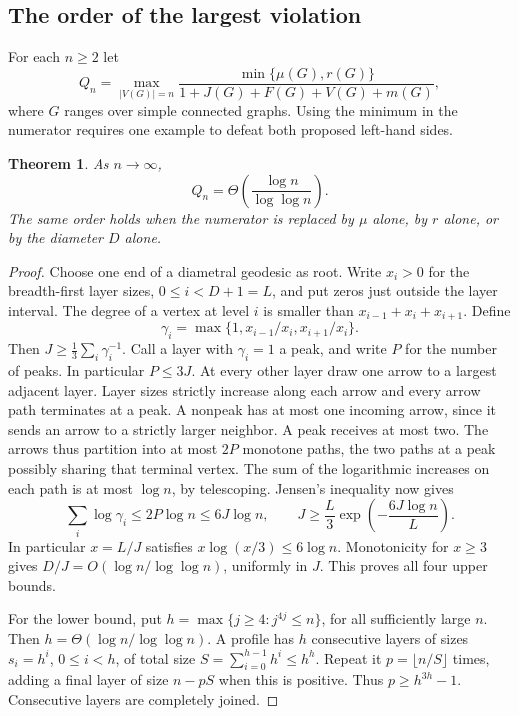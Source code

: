 \documentclass[11pt,a4paper]{article}
\newtheorem{theorem}{Theorem}[section]
\theoremstyle{remark}\newtheorem*{remark}{Remark}
\begin{document}
\subsection{The order of the largest violation}
For each $n\ge2$ let
\[
 Q_n=\max_{|V(G)|=n}\frac{\min\{\mu(G),r(G)\}}
             {1+J(G)+F(G)+V(G)+m(G)},
\]
where $G$ ranges over simple connected graphs. Using the minimum in the
numerator requires one example to defeat both proposed left-hand sides.

\begin{theorem}\label{thm:syn-chain-rate}
As $n\longrightarrow\infty$,
\[
 Q_n=\Theta\!\left(\frac{\log n}{\log\log n}\right).
\]
The same order holds when the numerator is replaced by $\mu$ alone, by
$r$ alone, or by the diameter $D$ alone.
\end{theorem}
\begin{proof}
Choose one end of a diametral geodesic as root. Write $x_i>0$ for the
breadth-first layer sizes, $0\le i<D+1=L$, and put zeros just outside
the layer interval. The degree of a vertex at level $i$ is smaller than
$x_{i-1}+x_i+x_{i+1}$. Define
\[
 \gamma_i=\max\{1,x_{i-1}/x_i,x_{i+1}/x_i\}.
\]
Then $J\ge\frac13\sum_i\gamma_i^{-1}$. Call a layer with
$\gamma_i=1$ a peak, and write $P$ for the number of peaks. In
particular $P\le3J$. At every other layer draw one arrow to a largest
adjacent layer. Layer sizes strictly increase along each arrow and every
arrow path terminates at a peak. A nonpeak has at most one incoming
arrow, since it sends an arrow to a strictly larger neighbor. A peak
receives at most two. The arrows thus partition into at most $2P$
monotone paths, the two paths at a peak possibly sharing that terminal
vertex. The sum of the logarithmic increases on each path is at most
$\log n$, by telescoping. Jensen's inequality now gives
\[
 \sum_i\log\gamma_i\le2P\log n\le6J\log n,
 \qquad J\ge\frac L3\exp\!\left(-\frac{6J\log n}{L}\right).
\]
In particular $x=L/J$ satisfies $x\log(x/3)\le6\log n$. Monotonicity for
$x\ge3$ gives $D/J=O(\log n/\log\log n)$, uniformly in $J$. This proves
all four upper bounds.

For the lower bound, put $h=\max\{j\ge4:j^{4j}\le n\}$, for all
sufficiently large $n$. Then $h=\Theta(\log n/\log\log n)$. A profile
has $h$ consecutive layers of sizes $s_i=h^i$, $0\le i<h$, of total
size $S=\sum_{i=0}^{h-1}h^i\le h^h$. Repeat it $p=\lfloor n/S\rfloor$
times, adding a final layer of size $n-pS$ when this is positive. Thus
$p\ge h^{3h}-1$. Consecutive layers are completely joined.


\end{proof}
\end{document}
